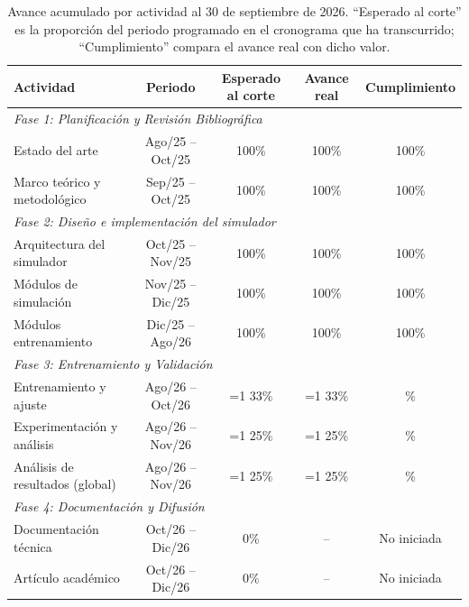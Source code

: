 \documentclass[letterpaper,10pt,oneside]{article}
\providecommand\corte{2}
\def\fechaCorte{31 de agosto de 2026}
\def\fechaCorte{30 de septiembre de 2026}
\newcommand\segun[2]{\ifnum\corte=1 #1\else #2\fi}
\def\espEntrenamiento{\segun{33}{67}}   \def\realEntrenamiento{\segun{33}{67}}
\def\espExperimentos{\segun{25}{50}}    \def\realExperimentos{\segun{25}{50}}
\def\espAnalisis{\segun{25}{50}}        \def\realAnalisis{\segun{25}{50}}
\newcommand\cumplimiento[2]{\fpeval{min(100, round(100*(#2)/(#1), 0))}\%}
\begin{document}
	\begin{table}[H]
		\centering
		\renewcommand{\arraystretch}{1.2}
		\begin{tabular}{l c c c c}
			\toprule
			\textbf{Actividad} & \textbf{Periodo} & \textbf{Esperado al corte} & \textbf{Avance real} & \textbf{Cumplimiento} \\
			\midrule
			\multicolumn{5}{l}{\textit{Fase 1: Planificación y Revisión Bibliográfica}} \\
			Estado del arte                  & Ago/25 -- Oct/25 & 100\% & 100\% & 100\% \\
			Marco teórico y metodológico     & Sep/25 -- Oct/25 & 100\% & 100\% & 100\% \\
			\multicolumn{5}{l}{\textit{Fase 2: Diseño e implementación del simulador}} \\
			Arquitectura del simulador       & Oct/25 -- Nov/25 & 100\% & 100\% & 100\% \\
			Módulos de simulación            & Nov/25 -- Dic/25 & 100\% & 100\% & 100\% \\
			Módulos entrenamiento            & Dic/25 -- Ago/26 & 100\% & 100\% & 100\% \\
			\multicolumn{5}{l}{\textit{Fase 3: Entrenamiento y Validación}} \\
			Entrenamiento y ajuste           & Ago/26 -- Oct/26 & \espEntrenamiento\% & \realEntrenamiento\% & \cumplimiento{\espEntrenamiento}{\realEntrenamiento} \\
			Experimentación y análisis       & Ago/26 -- Nov/26 & \espExperimentos\%  & \realExperimentos\%  & \cumplimiento{\espExperimentos}{\realExperimentos} \\
			Análisis de resultados (global)  & Ago/26 -- Nov/26 & \espAnalisis\%      & \realAnalisis\%      & \cumplimiento{\espAnalisis}{\realAnalisis} \\
			\multicolumn{5}{l}{\textit{Fase 4: Documentación y Difusión}} \\
			Documentación técnica            & Oct/26 -- Dic/26 & 0\% & -- & No iniciada \\
			Artículo académico               & Oct/26 -- Dic/26 & 0\% & -- & No iniciada \\
			\bottomrule
		\end{tabular}
		\caption{Avance acumulado por actividad al \fechaCorte. ``Esperado al corte'' es la proporción del periodo
		programado en el cronograma que ha transcurrido; ``Cumplimiento'' compara el avance real con dicho valor.}
	\end{table}
\end{document}
